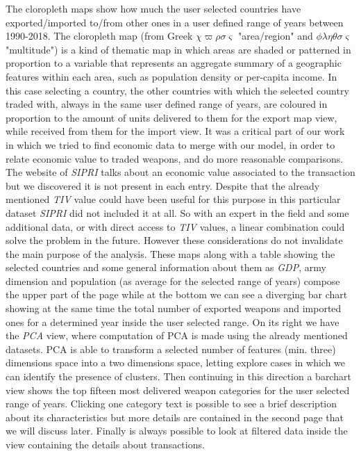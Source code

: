 \documentclass{article}
\begin{document}
\begin{multicols}{2}
The cloropleth maps show how much the user selected countries have exported/imported to/from other ones in a user defined range of years between 1990-2018. The cloropleth map (from Greek $\chi\varpi\rho\sigma\varsigma$ "area/region" and $\phi\lambda\eta\theta\sigma\varsigma$ "multitude") is a kind of thematic map in which areas are shaded or patterned in proportion to a variable that represents an aggregate summary of a geographic features within each area, such as population density or per-capita income. In this case selecting a country, the other countries with which the selected country traded with, always in the same user defined range of years, are coloured in proportion to the amount of units delivered  to them for the export map view, while received from them for the import view.
It was a critical part of our work in which we tried to find economic data to merge with our model, in order to relate economic value to traded weapons, and do more reasonable comparisons. The website of \textit{SIPRI} talks about an economic value associated to the transaction but we discovered it is not present in each entry. Despite that the already mentioned \textit{TIV} value could have been useful for this purpose in this particular dataset \textit{SIPRI} did not included it at all. So with an expert in the field and some additional data, or with direct access to \textit{TIV} values, a linear combination could solve the problem in the future. However these considerations do not invalidate the main purpose of the analysis.
These maps along with a table showing the selected countries and some general information about them as \textit{GDP}, army dimension and population (as average for the selected range of years) compose the upper part of the page while at the bottom we can see a diverging bar chart showing at the same time the total number of exported weapons and imported ones for a determined year inside the user selected range. 
On its right we have the \textit{PCA} view, where computation of PCA is made using the already mentioned datasets. PCA is able to transform a selected number of features (min. three) dimensions space into a two dimensions space, letting explore cases in which we can identify the presence of clusters. Then continuing in this direction a barchart view shows the top fifteen most delivered weapon categories for the user selected range of years. Clicking one category text is possible to see a brief description about its characteristics but more details are contained in the second page that we will discuss later. Finally is always possible to look at filtered data inside the view containing the details about transactions.


\end{multicols}
\end{document}
